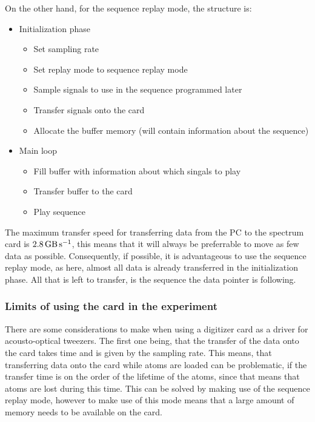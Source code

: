 \begin{minipage}{\textwidth}
On the other hand, for the sequence replay mode, the structure is:

\begin{itemize}
	\item Initialization phase
		\begin{itemize}
			\item Set sampling rate
			\item Set replay mode to sequence replay mode
			\item Sample signals to use in the sequence programmed later
			\item Transfer signals onto the card
			\item Allocate the buffer memory (will contain information about the sequence)
		\end{itemize}
	\item Main loop
		\begin{itemize}
			\item Fill buffer with information about which singals to play
			\item Transfer buffer to the card
			\item Play sequence
		\end{itemize}
\end{itemize}
\end{minipage}

The maximum transfer speed for transferring data from the PC to the spectrum card is $\SI{2.8}{\giga\byte\per\second}$, this means that it will always be preferrable to move as few data as possible. Consequently, if possible, it is advantageous to use the sequence replay mode, as here, almost all data is already transferred in the initialization phase. All that is left to transfer, is the sequence the data pointer is following.

\subsubsection*{Limits of using the card in the experiment}

There are some considerations to make when using a digitizer card as a driver for acousto-optical tweezers. The first one being, that the transfer of the data onto the card takes time and is given by the sampling rate. This means, that transferring data onto the card while atoms are loaded can be problematic, if the transfer time is on the order of the lifetime of the atoms, since that means that atoms are lost during this time. This can be solved by making use of the sequence replay mode, however to make use of this mode means that a large amount of memory needs to be available on the card.

